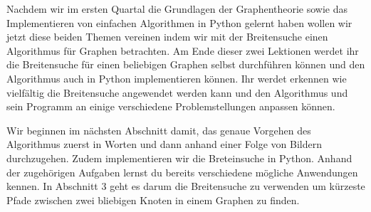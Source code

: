 Nachdem wir im ersten Quartal die Grundlagen der Graphentheorie sowie das Implementieren von einfachen Algorithmen in Python gelernt haben wollen wir jetzt diese beiden Themen vereinen indem wir mit der Breitensuche einen Algorithmus für Graphen betrachten. Am Ende dieser zwei Lektionen werdet ihr die Breitensuche für einen beliebigen Graphen selbst durchführen können und den Algorithmus auch in Python implementieren können. Ihr werdet erkennen wie vielfältig die Breitensuche angewendet werden kann und den Algorithmus und sein Programm an einige verschiedene Problemstellungen anpassen können.

Wir beginnen im nächsten Abschnitt damit, das genaue Vorgehen des Algorithmus zuerst in Worten und dann anhand einer Folge von Bildern durchzugehen. Zudem implementieren wir die Breteinsuche in Python. Anhand der zugehörigen Aufgaben lernst du bereits verschiedene mögliche Anwendungen kennen.  In Abschnitt 3 geht es darum die Breitensuche zu verwenden um kürzeste Pfade zwischen zwei bliebigen Knoten in einem Graphen zu finden.